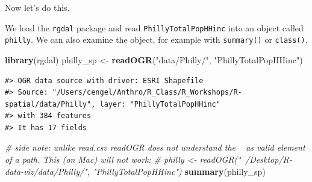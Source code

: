 \documentclass[]{book}
\newenvironment{Shaded}{\begin{snugshade}}{\end{snugshade}}
\newcommand{\KeywordTok}[1]{\textcolor[rgb]{0.13,0.29,0.53}{\textbf{#1}}}
\newcommand{\StringTok}[1]{\textcolor[rgb]{0.31,0.60,0.02}{#1}}
\newcommand{\CommentTok}[1]{\textcolor[rgb]{0.56,0.35,0.01}{\textit{#1}}}
\newcommand{\NormalTok}[1]{#1}
\theoremstyle{definition}
\theoremstyle{definition}
\theoremstyle{definition}
\theoremstyle{remark}
\begin{document}
Now let's do this.

We load the \texttt{rgdal} package and read \texttt{PhillyTotalPopHHinc}
into an object called \texttt{philly}. We can also examine the object,
for example with \texttt{summary()} or \texttt{class()}.

\begin{Shaded}
\begin{Highlighting}[]
\KeywordTok{library}\NormalTok{(rgdal)}
\NormalTok{philly_sp <-}\StringTok{ }\KeywordTok{readOGR}\NormalTok{(}\StringTok{"data/Philly/"}\NormalTok{, }\StringTok{"PhillyTotalPopHHinc"}\NormalTok{) }
\end{Highlighting}
\end{Shaded}

\begin{verbatim}
#> OGR data source with driver: ESRI Shapefile 
#> Source: "/Users/cengel/Anthro/R_Class/R_Workshops/R-spatial/data/Philly", layer: "PhillyTotalPopHHinc"
#> with 384 features
#> It has 17 fields
\end{verbatim}

\begin{Shaded}
\begin{Highlighting}[]
\CommentTok{# side note: unlike read.csv readOGR does not understand the ~ as valid element of a path. This (on Mac) will not work:}
\CommentTok{# philly <- readOGR("~/Desktop/R-data-viz/data/Philly/", "PhillyTotalPopHHinc")}
\KeywordTok{summary}\NormalTok{(philly_sp)}
\end{Highlighting}
\end{Shaded}
\end{document}
